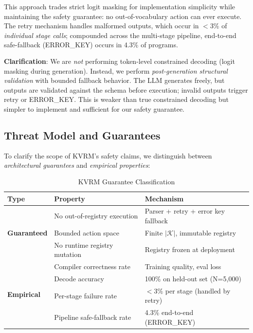 \documentclass[11pt,a4paper]{article}
\begin{document}
This approach trades strict logit masking for implementation simplicity while maintaining the safety guarantee: no out-of-vocabulary action can ever execute. The retry mechanism handles malformed outputs, which occur in $<$3\% of \textit{individual stage calls}; compounded across the multi-stage pipeline, end-to-end safe-fallback (ERROR\_KEY) occurs in 4.3\% of programs.

\textbf{Clarification}: We are \textit{not} performing token-level constrained decoding (logit masking during generation). Instead, we perform \textit{post-generation structural validation} with bounded fallback behavior. The LLM generates freely, but outputs are validated against the schema before execution; invalid outputs trigger retry or ERROR\_KEY. This is weaker than true constrained decoding but simpler to implement and sufficient for our safety guarantee.

\subsection{Threat Model and Guarantees}

To clarify the scope of KVRM's safety claims, we distinguish between \textit{architectural guarantees} and \textit{empirical properties}:

\begin{table}[H]
\centering
\caption{KVRM Guarantee Classification}
\label{tab:guarantees}
\begin{tabular}{@{}llp{6cm}@{}}
\toprule
\textbf{Type} & \textbf{Property} & \textbf{Mechanism} \\
\midrule
\multirow{3}{*}{\textbf{Guaranteed}} & No out-of-registry execution & Parser + retry + error key fallback \\
 & Bounded action space & Finite $|\mathcal{K}|$, immutable registry \\
 & No runtime registry mutation & Registry frozen at deployment \\
\midrule
\multirow{4}{*}{\textbf{Empirical}} & Compiler correctness rate & Training quality, eval loss \\
 & Decode accuracy & 100\% on held-out set (N=5,000) \\
 & Per-stage failure rate & $<$3\% per stage (handled by retry) \\
 & Pipeline safe-fallback rate & 4.3\% end-to-end (ERROR\_KEY) \\
\bottomrule
\end{tabular}
\end{table}
\end{document}
